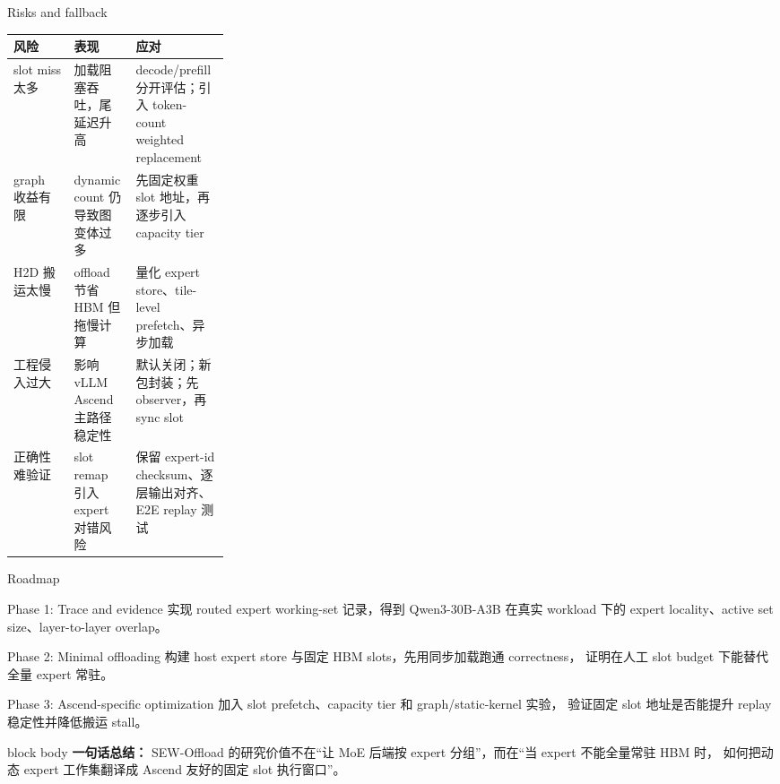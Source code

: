 \documentclass[aspectratio=169,10pt]{beamer}
\begin{document}
\begin{frame}[t]{Risks and fallback}
\small
\vspace{-0.4em}

\begin{tabularx}{\linewidth}{p{0.28\linewidth}X X}
\toprule
\textbf{风险} & \textbf{表现} & \textbf{应对} \\
\midrule
slot miss 太多 & 加载阻塞吞吐，尾延迟升高 & decode/prefill 分开评估；引入 token-count weighted replacement \\
graph 收益有限 & dynamic count 仍导致图变体过多 & 先固定权重 slot 地址，再逐步引入 capacity tier \\
H2D 搬运太慢 & offload 节省 HBM 但拖慢计算 & 量化 expert store、tile-level prefetch、异步加载 \\
工程侵入过大 & 影响 vLLM Ascend 主路径稳定性 & 默认关闭；新包封装；先 observer，再 sync slot \\
正确性难验证 & slot remap 引入 expert 对错风险 & 保留 expert-id checksum、逐层输出对齐、E2E replay 测试 \\
\bottomrule
\end{tabularx}
\end{frame}

\begin{frame}[t]{Roadmap}
\small
\vspace{-0.4em}

\begin{block}{Phase 1: Trace and evidence}
\footnotesize
实现 routed expert working-set 记录，得到 Qwen3-30B-A3B 在真实 workload 下的 expert locality、active set size、layer-to-layer overlap。
\end{block}

\begin{block}{Phase 2: Minimal offloading}
\footnotesize
构建 host expert store 与固定 HBM slots，先用同步加载跑通 correctness，
证明在人工 slot budget 下能替代全量 expert 常驻。
\end{block}

\begin{block}{Phase 3: Ascend-specific optimization}
\footnotesize
加入 slot prefetch、capacity tier 和 graph/static-kernel 实验，
验证固定 slot 地址是否能提升 replay 稳定性并降低搬运 stall。
\end{block}

\begin{beamercolorbox}[wd=\linewidth,sep=0.7em,rounded=true]{block body}
\textbf{\textcolor{AccentRed}{一句话总结：}}
SEW-Offload 的研究价值不在“让 MoE 后端按 expert 分组”，而在“当 expert 不能全量常驻 HBM 时，
如何把动态 expert 工作集翻译成 Ascend 友好的固定 slot 执行窗口”。
\end{beamercolorbox}
\end{frame}

\fi
\end{document}
